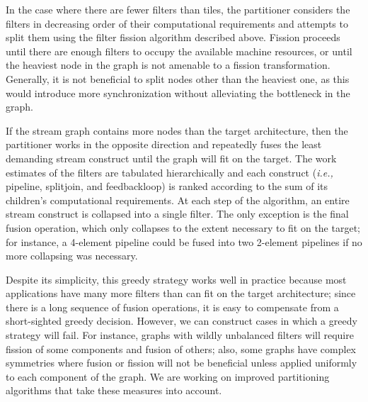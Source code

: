 In the case where there are fewer filters than tiles, the partitioner
considers the filters in decreasing order of their computational
requirements and attempts to split them using the filter fission
algorithm described above.  Fission proceeds until there are enough
filters to occupy the available machine resources, or until the
heaviest node in the graph is not amenable to a fission
transformation.  Generally, it is not beneficial to split nodes other
than the heaviest one, as this would introduce more synchronization
without alleviating the bottleneck in the graph.

If the stream graph contains more nodes than the target architecture,
then the partitioner works in the opposite direction and repeatedly
fuses the least demanding stream construct until the graph will fit on
the target.  The work estimates of the filters are tabulated
hierarchically and each construct ({\it i.e.,} pipeline, splitjoin,
and feedbackloop) is ranked according to the sum of its children's
computational requirements.  At each step of the algorithm, an entire
stream construct is collapsed into a single filter.  The only
exception is the final fusion operation, which only collapses to the
extent necessary to fit on the target; for instance, a 4-element
pipeline could be fused into two 2-element pipelines if no more
collapsing was necessary.

Despite its simplicity, this greedy strategy works well in practice
because most applications have many more filters than can fit on the
target architecture; since there is a long sequence of fusion
operations, it is easy to compensate from a short-sighted greedy
decision.  However, we can construct cases in which a greedy strategy
will fail.  For instance, graphs with wildly unbalanced filters will
require fission of some components and fusion of others; also, some
graphs have complex symmetries where fusion or fission will not be
beneficial unless applied uniformly to each component of the graph.
We are working on improved partitioning algorithms that take these
measures into account.
